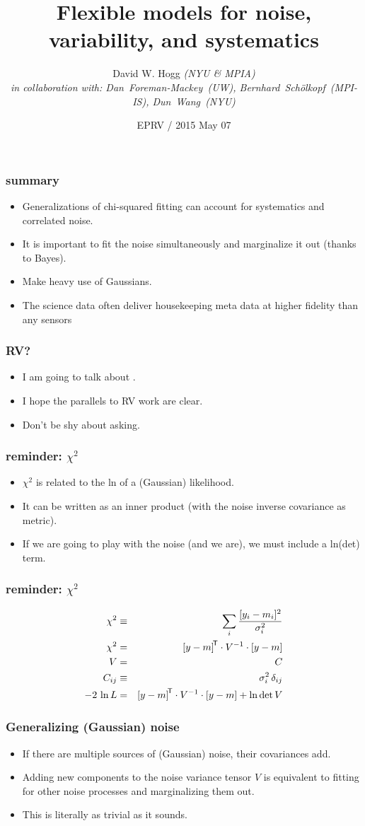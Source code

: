 \documentclass[pdftex]{beamer}
\title{Flexible models for noise, variability, and systematics}
\author[David W. Hogg (NYU)]{David W. Hogg \textsl{(NYU \& MPIA)}\\
  \textsl{\footnotesize
  in collaboration with:
  Dan~Foreman-Mackey~\textsl{(UW)},
  Bernhard~Sch\"olkopf~\textsl{(MPI-IS)},
  Dun~Wang~\textsl{(NYU)}}}
\date{EPRV / 2015 May 07}
\newcommand{\conclusions}{%
\begin{frame}
  \frametitle{summary}
  \begin{itemize}
  \item Generalizations of chi-squared fitting can account for
    systematics and correlated noise.
  \item It is important to fit the noise simultaneously and
    marginalize it out (thanks to Bayes).
  \item Make heavy use of Gaussians.
  \item The science data often deliver housekeeping meta data at
    higher fidelity than any sensors
  \end{itemize}
\end{frame}}
\begin{document}
\begin{frame}
  \titlepage
\end{frame}

\conclusions

\begin{frame}
  \frametitle{RV?}
  \begin{itemize}
  \item I am going to talk about \kepler.
  \item I hope the parallels to RV work are clear.
  \item Don't be shy about asking.
  \end{itemize}
\end{frame}

\begin{frame}
  \frametitle{reminder: $\chi^2$}
  \begin{itemize}
  \item $\chi^2$ is related to the ln of a (Gaussian) likelihood.
  \item It can be written as an inner product (with the noise inverse
    covariance as metric).
  \item If we are going to play with the noise (and we are), we must
    include a ln(det) term.
  \end{itemize}
\end{frame}

\begin{frame}
  \frametitle{reminder: $\chi^2$}
  \begin{eqnarray}
    \chi^2 &\equiv& \sum_i \frac{[y_i - m_i]^2}{\sigma_i^2}
    \nonumber \\
    \chi^2 &=& {[y - m]}^{\mathsf{\!T}}\cdot V^{-1}\cdot [y - m]
    \nonumber \\
    V &=& C
    \nonumber \\
    C_{ij} &\equiv& \sigma_i^2\,\delta_{ij}
    \nonumber \\
    -2\,\ln L &=& {[y - m]}^{\mathsf{\!T}}\cdot V^{-1}\cdot [y - m] + \ln\det V
    \nonumber
  \end{eqnarray}
\end{frame}

\begin{frame}
  \frametitle{Generalizing (Gaussian) noise}
  \begin{itemize}
  \item If there are multiple sources of (Gaussian) noise, their
    covariances add.
  \item Adding new components to the noise variance tensor $V$ is
    equivalent to fitting for other noise processes and marginalizing
    them out.
  \item This is literally as trivial as it sounds.
  \end{itemize}
\end{frame}
\end{document}
